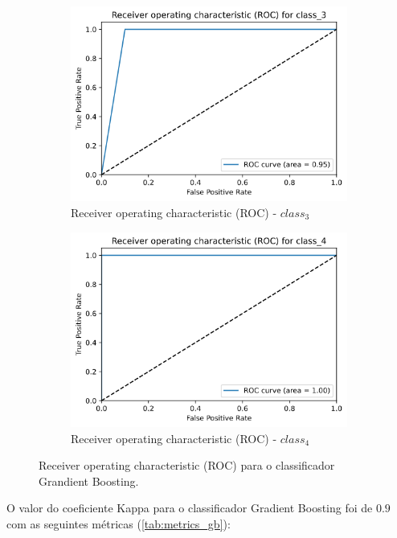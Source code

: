 \documentclass[
	article,			%
	11pt,				%
	oneside,			%
	a4paper,			%
	english,			%
	brazil,				%
	sumario=tradicional
	]{abntex2}
\begin{document}
\begin{figure}
\begin{subfigure}[b]{0.475\textwidth}
    \includegraphics[scale=0.375]{fig/gb_roc3.png}
    \caption{Receiver operating characteristic (ROC) - $class_3$}
    \label{fig:gb_roc3}
    \end{subfigure}
    \hfill
    \begin{subfigure}[b]{0.475\textwidth}
    \centering
    \includegraphics[scale=0.375]{fig/gb_roc4.png}
    \caption{Receiver operating characteristic (ROC) - $class_4$}
    \label{fig:gb_roc4}
    \end{subfigure}
    \caption{Receiver operating characteristic (ROC) para o classificador Grandient Boosting.}
    \label{gb_roc}
\end{figure}


O valor do coeficiente Kappa para o classificador Gradient Boosting foi de $0.9$ com as seguintes métricas (\ref{tab:metrics_gb}):
\end{document}
